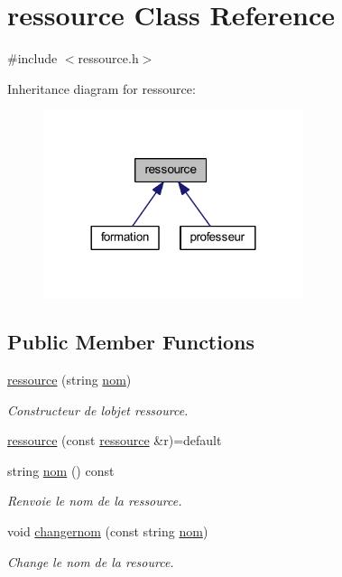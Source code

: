 \hypertarget{classressource}{}\section{ressource Class Reference}
\label{classressource}


{\ttfamily \#include $<$ressource.\+h$>$}



Inheritance diagram for ressource\+:
\nopagebreak
\begin{figure}[H]
\begin{center}
\leavevmode
\includegraphics[width=216pt]{classressource__inherit__graph}
\end{center}
\end{figure}
\subsection*{Public Member Functions}
\begin{DoxyCompactItemize}
\item 
\hyperlink{classressource_a261f4c729d03d562e1d35187999ce4ef}{ressource} (string \hyperlink{classressource_aff712b6d732b3f4091dd29f4349aba85}{nom})
\begin{DoxyCompactList}\small\item\em Constructeur de l\textquotesingle{}objet ressource. \end{DoxyCompactList}\item 
\hyperlink{classressource_adccfe979d5ccf07ae4f0cfa944e9f1b0}{ressource} (const \hyperlink{classressource}{ressource} \&r)=default
\item 
string \hyperlink{classressource_aff712b6d732b3f4091dd29f4349aba85}{nom} () const
\begin{DoxyCompactList}\small\item\em Renvoie le nom de la ressource. \end{DoxyCompactList}\item 
void \hyperlink{classressource_a2c2b1bee5ae87b3accdd84c088aef2fd}{changernom} (const string \hyperlink{classressource_aff712b6d732b3f4091dd29f4349aba85}{nom})
\begin{DoxyCompactList}\small\item\em Change le nom de la resource. \end{DoxyCompactList}\end{DoxyCompactItemize}


